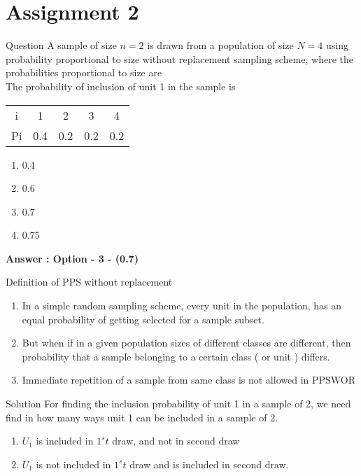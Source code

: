 \documentclass[10pt]{beamer}
\begin{document}
\section{Assignment 2}

\begin{frame}[fragile]{Question}
A sample of size $n = 2$ is drawn from a population of size $N = 4$ using probability proportional to size
without replacement sampling scheme, where the probabilities proportional to size are\\
The probability of inclusion of unit 1 in the sample is
\begin{center}
\begin{tabular}{ c c c c c}
 i  & 1   & 2   & 3   & 4   \\ 
 Pi & 0.4 & 0.2 & 0.2 & 0.2 \\  
\end{tabular}
\end{center}
\begin{enumerate}
    \item 0.4 
    \item 0.6
    \item 0.7
    \item 0.75
\end{enumerate}
\large \textbf{Answer : Option - 3 - (0.7)}\\
\end{frame}

\begin{frame}{Definition of PPS without replacement}
\begin{enumerate}
    \item In a simple random sampling scheme, every unit in the population, has an equal probability of getting selected for a sample subset.
    \item  But when if in a given population sizes of different classes are different, then probability that a sample belonging to a certain class ( or unit ) differs.
    \item  Immediate repetition of a sample from same class is not allowed in PPSWOR
\end{enumerate}
\end{frame}

\begin{frame}{Solution}
For finding the inclusion probability of unit 1 in a sample of 2, we need find in how many ways unit 1 can be included in a sample of 2.
\begin{enumerate}
    \item $U_1$ is included in $1^st$ draw, and not in second draw
    \item $U_1$ is not included in $1^st$ draw and is included in second draw.
\end{enumerate}
\end{frame}
\end{document}
